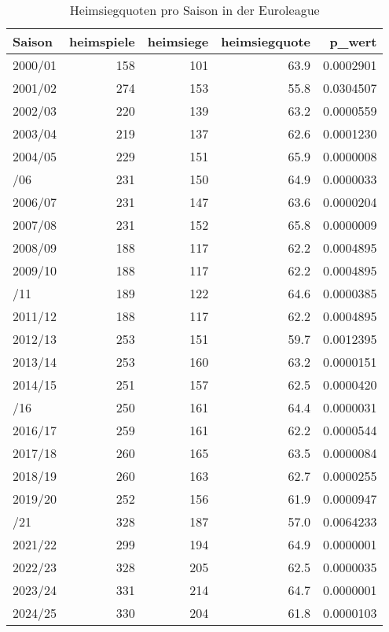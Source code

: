\begin{table}

\caption{Heimsiegquoten pro Saison in der Euroleague}
\centering
\begin{tabular}[t]{lrrrr}
\toprule
Saison & heimspiele & heimsiege & heimsiegquote & p\_wert\\
\midrule
2000/01 & 158 & 101 & 63.9 & 0.0002901\\
2001/02 & 274 & 153 & 55.8 & 0.0304507\\
2002/03 & 220 & 139 & 63.2 & 0.0000559\\
2003/04 & 219 & 137 & 62.6 & 0.0001230\\
2004/05 & 229 & 151 & 65.9 & 0.0000008\\
\addlinespace
2005/06 & 231 & 150 & 64.9 & 0.0000033\\
2006/07 & 231 & 147 & 63.6 & 0.0000204\\
2007/08 & 231 & 152 & 65.8 & 0.0000009\\
2008/09 & 188 & 117 & 62.2 & 0.0004895\\
2009/10 & 188 & 117 & 62.2 & 0.0004895\\
\addlinespace
2010/11 & 189 & 122 & 64.6 & 0.0000385\\
2011/12 & 188 & 117 & 62.2 & 0.0004895\\
2012/13 & 253 & 151 & 59.7 & 0.0012395\\
2013/14 & 253 & 160 & 63.2 & 0.0000151\\
2014/15 & 251 & 157 & 62.5 & 0.0000420\\
\addlinespace
2015/16 & 250 & 161 & 64.4 & 0.0000031\\
2016/17 & 259 & 161 & 62.2 & 0.0000544\\
2017/18 & 260 & 165 & 63.5 & 0.0000084\\
2018/19 & 260 & 163 & 62.7 & 0.0000255\\
2019/20 & 252 & 156 & 61.9 & 0.0000947\\
\addlinespace
2020/21 & 328 & 187 & 57.0 & 0.0064233\\
2021/22 & 299 & 194 & 64.9 & 0.0000001\\
2022/23 & 328 & 205 & 62.5 & 0.0000035\\
2023/24 & 331 & 214 & 64.7 & 0.0000001\\
2024/25 & 330 & 204 & 61.8 & 0.0000103\\
\bottomrule
\end{tabular}
\end{table}
